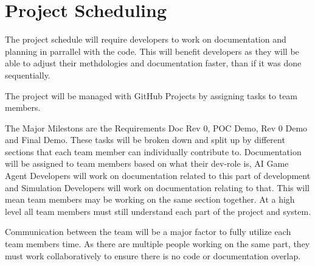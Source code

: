 \documentclass{article}
\begin{document}
\section{Project Scheduling}
The project schedule will require developers to work on documentation and planning in parrallel with the code. This will benefit developers as they will be able to adjust their 
methdologies and documentation faster, than if it was done sequentially.

The project will be managed with GitHub Projects by assigning tasks to team members.

The Major Milestons are the Requirements Doc Rev 0, POC Demo, Rev 0 Demo and Final Demo. These tasks will be broken down and split up by different sections that each team member can individually contribute to.
Documentation will be assigned to team members based on what their dev-role is, AI Game Agent Developers will work on documentation related to this part of development and
Simulation Developers will work on documentation relating to that. This will mean team members may be working on the same section together. At a high level all team members must still understand each part of the project and system.

Communication between the team will be a major factor to fully utilize each team members time. As there are multiple people working on the same part, they must work collaboratively to ensure there is no code or documentation overlap. 
\end{document}
